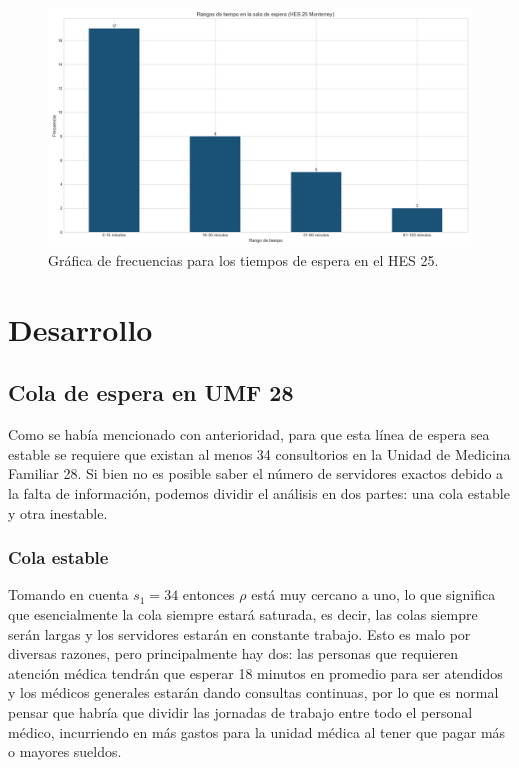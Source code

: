 \documentclass[10pt]{article}
\begin{document}
    \begin{figure}[h]
    	\centering
    	\includegraphics[width=130mm]{./images/rangos-tiempo-espera-hes25.png}
    	\caption{Gráfica de frecuencias para los tiempos de espera en el HES 25.}
    	\label{fig:frec_espera_hes25}
    \end{figure}
    
    \newpage
    
    \section{Desarrollo} \label{sec:desarrollo}
    \subsection{Cola de espera en UMF 28}
    Como se había mencionado con anterioridad, para que esta línea de espera sea estable se requiere que existan al menos 34 consultorios en la Unidad de Medicina Familiar 28. Si bien no es posible saber el número de servidores exactos debido a la falta de información, podemos dividir el análisis en dos partes: una cola estable y otra inestable.
    
    \subsubsection{Cola estable}
    Tomando en cuenta $s_{1} = 34$ entonces $\rho$ está muy cercano a uno, lo que significa que esencialmente la cola siempre estará saturada, es decir, las colas siempre serán largas y los servidores estarán en constante trabajo. Esto es malo por diversas razones, pero principalmente hay dos: las personas que requieren atención médica tendrán que esperar 18 minutos en promedio para ser atendidos y los médicos generales estarán dando consultas continuas, por lo que es normal pensar que habría que dividir las jornadas de trabajo entre todo el personal médico, incurriendo en más gastos para la unidad médica al tener que pagar más o mayores sueldos. 
    
\end{document}
